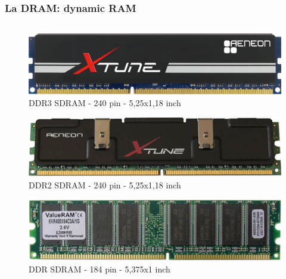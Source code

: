 \begin{frame}
	\frametitle{La DRAM: dynamic RAM}
	
	\begin{columns}			
		\begin{scriptsize}
			\begin{figure}[!htbp]
				\centering
				\vspace{0.5em}
				\includegraphics[width=0.9\linewidth]{images/5_memory/ddr3.png}
				\\DDR3 SDRAM - 240 pin - 5,25x1,18 inch\\\vspace{0.9em}
				
				\includegraphics[width=0.9\linewidth]{images/5_memory/ddr2.png}
				\\DDR2 SDRAM - 240 pin - 5,25x1,18 inch\\\vspace{0.5em}
				
				\includegraphics[width=0.9\linewidth]{images/5_memory/ddr1.png}
				\\DDR SDRAM - 184 pin - 5,375x1 inch\\\vspace{1em}
			\end{figure}
		\end{scriptsize}

		
		

\end{columns}
\end{frame}
